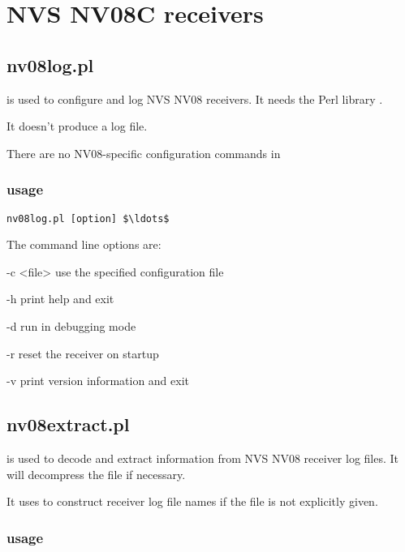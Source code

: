 \section{NVS NV08C receivers}

\subsection{nv08log.pl} \hypertarget{h:nvslog}{}

 is used to configure and log NVS NV08 receivers.
It needs the Perl library .

It doesn't produce a log file.

There are no NV08-specific configuration commands in 

\subsubsection{usage}

\begin{lstlisting}[mathescape=true]
nv08log.pl [option] $\ldots$ 
\end{lstlisting}

The command line options are:
\begin{description*}
	\item[-c \textless{file}\textgreater] use the specified configuration file
	\item[-h] print help and exit
	\item[-d] run in debugging mode
	\item[-r] reset the receiver on startup
	\item[-v] print version information and exit
\end{description*}

\subsection{nv08extract.pl} \hypertarget{h:nv08extract}{}

 is used to decode and extract information from NVS NV08 receiver log files. 
It will decompress the file if necessary.

It uses  to construct receiver log file names if the file is not explicitly given.

\subsubsection{usage}

